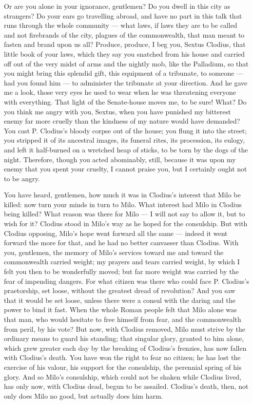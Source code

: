 Or are you alone in your ignorance, gentlemen? Do you dwell in this city as strangers? Do your ears go travelling abroad, and have no part in this talk that runs through the whole community --- what laws, if laws they are to be called and not firebrands of the city, plagues of the commonwealth, that man meant to fasten and brand upon us all? Produce, produce, I beg you, Sextus Clodius, that little book of your laws, which they say you snatched from his house and carried off out of the very midst of arms and the nightly mob, like the Palladium, so that you might bring this splendid gift, this equipment of a tribunate, to someone --- had you found him --- to administer the tribunate at your direction. And he gave me a look, those very eyes he used to wear when he was threatening everyone with everything. That light of the Senate-house moves me, to be sure! What? Do you think me angry with you, Sextus, when you have punished my bitterest enemy far more cruelly than the kindness of my nature would have demanded? You cast P. Clodius's bloody corpse out of the house; you flung it into the street; you stripped it of its ancestral images, its funeral rites, its procession, its eulogy, and left it half-burned on a wretched heap of sticks, to be torn by the dogs of the night. Therefore, though you acted abominably, still, because it was upon my enemy that you spent your cruelty, I cannot praise you, but I certainly ought not to be angry.

 You have heard, gentlemen, how much it was in Clodius's interest that Milo be killed: now turn your minds in turn to Milo. What interest had Milo in Clodius being killed? What reason was there for Milo --- I will not say to allow it, but to wish for it? Clodius stood in Milo's way as he hoped for the consulship. But with Clodius opposing, Milo's hope went forward all the same --- indeed it went forward the more for that, and he had no better canvasser than Clodius. With you, gentlemen, the memory of Milo's services toward me and toward the commonwealth carried weight; my prayers and tears carried weight, by which I felt you then to be wonderfully moved; but far more weight was carried by the fear of impending dangers. For what citizen was there who could face P. Clodius's praetorship, set loose, without the greatest dread of revolution? And you saw that it would be set loose, unless there were a consul with the daring and the power to bind it fast. When the whole Roman people felt that Milo alone was that man, who would hesitate to free himself from fear, and the commonwealth from peril, by his vote? But now, with Clodius removed, Milo must strive by the ordinary means to guard his standing; that singular glory, granted to him alone, which grew greater each day by the breaking of Clodius's frenzies, has now fallen with Clodius's death. You have won the right to fear no citizen; he has lost the exercise of his valour, his support for the consulship, the perennial spring of his glory. And so Milo's consulship, which could not be shaken while Clodius lived, has only now, with Clodius dead, begun to be assailed. Clodius's death, then, not only does Milo no good, but actually does him harm.


